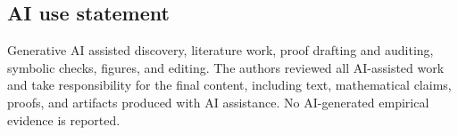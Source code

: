 \documentclass{article}
\theoremstyle{definition}
\theoremstyle{remark}
\begin{document}
\subsection*{AI use statement}
Generative AI assisted discovery, literature work, proof drafting and auditing,
symbolic checks, figures, and editing.  The authors reviewed all AI-assisted work
and take responsibility for the final content, including text, mathematical
claims, proofs, and artifacts produced with AI assistance.  No
AI-generated empirical evidence is reported.




\appendix

















\end{document}
